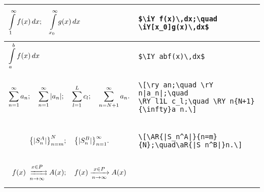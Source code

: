 \documentclass{article}
\begin{document}
\begin{longtable}{|p{}|p{}|}
$\iY f(x)\,dx;\quad \iY[x_0]g(x)\,dx$&\begin{verbatim}$\iY f(x)\,dx;\quad \iY[x_0]g(x)\,dx$\end{verbatim}\\\hline
$\IY abf(x)\,dx$&\begin{verbatim}$\IY abf(x)\,dx$\end{verbatim}\\\hline
\[\ry an;\quad \rY n|a_n|;\quad \RY l1L c_l;\quad \RY n{N+1}{\infty}a_n.\]&\begin{verbatim}\[\ry an;\quad \rY n|a_n|;\quad 
\RY l1L c_l;\quad \RY n{N+1}{\infty}a_n.\]\end{verbatim}\\\hline
\[\AR{|S_n^A|}{n=m}{N};\quad\aR{|S_n^B|}n.\]&\begin{verbatim}\[\AR{|S_n^A|}{n=m}{N};\quad\aR{|S_n^B|}n.\]\end{verbatim}\\\hline
\[f(x)\rsh[x\in P]nA(x);\quad f(x)\xrightarrow[n\to\infty]{x\in P}A(x)\]
\end{longtable}
\end{document}
